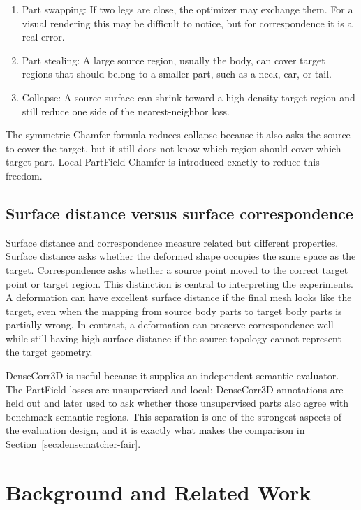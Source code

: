 \documentclass{article}
\begin{document}
\begin{enumerate}
  \item Part swapping: If two legs are close, the optimizer may exchange them. For a
  visual rendering this may be difficult to notice, but for correspondence it is a real error.
  \item Part stealing: A large source region, usually the body, can cover target regions
  that should belong to a smaller part, such as a neck, ear, or tail.
  \item Collapse: A source surface can shrink toward a high-density target region and
  still reduce one side of the nearest-neighbor loss.
\end{enumerate}

The symmetric Chamfer formula reduces collapse because it also asks the source to cover the target,
but it still does not know which region should cover which target part. Local PartField Chamfer is
introduced exactly to reduce this freedom.

\subsection{Surface distance versus surface correspondence}

Surface distance and correspondence measure related but different properties. Surface distance asks
whether the deformed shape occupies the same space as the target. Correspondence asks whether a
source point moved to the correct target point or target region. This distinction is central to
interpreting the experiments. A deformation can have excellent surface distance if the final mesh
looks like the target, even when the mapping from source body parts to target body parts is
partially wrong. In contrast, a deformation can preserve correspondence well while still having high
surface distance if the source topology cannot represent the target geometry.

DenseCorr3D is useful because it supplies an independent semantic evaluator. The PartField losses
are unsupervised and local; DenseCorr3D annotations are held out and later used to ask whether those
unsupervised parts also agree with benchmark semantic regions. This separation is one of the
strongest aspects of the evaluation design, and it is exactly what makes the comparison in
Section~\ref{sec:densematcher-fair}.

\section{Background and Related Work}
\end{document}

